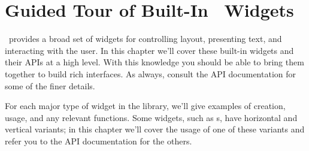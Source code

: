 \chapter{Guided Tour of Built-In \vtyui\ Widgets}
\label{chap:guided_tour}

\vtyui\ provides a broad set of widgets for controlling layout,
presenting text, and interacting with the user.  In this chapter we'll
cover these built-in widgets and their APIs at a high level.  With
this knowledge you should be able to bring them together to build rich
interfaces.  As always, consult the API documentation for some of the
finer details.

For each major type of widget in the library, we'll give examples of
creation, usage, and any relevant functions.  Some widgets, such as
s, have horizontal and vertical variants; in this chapter
we'll cover the usage of one of these variants and refer you to the
API documentation for the others.



















